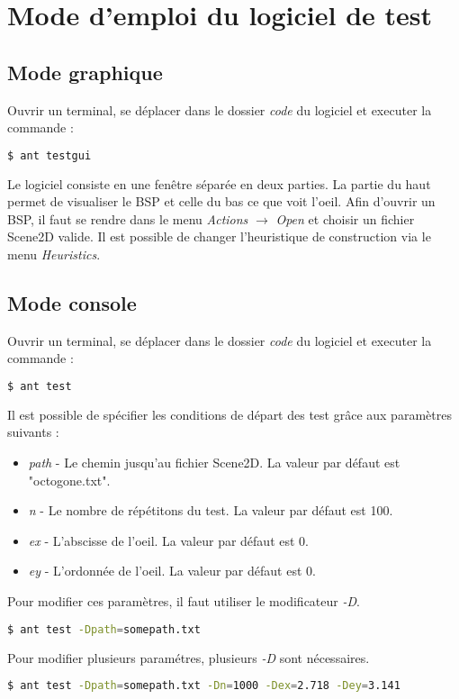 \documentclass[11pts]{article}
\begin{document}
\newpage
\section{Mode d'emploi du logiciel de test}
\subsection*{Mode graphique}
Ouvrir un terminal, se déplacer dans le dossier \emph{code} du logiciel et executer la commande :
\begin{lstlisting}[language=bash]
$ ant testgui
\end{lstlisting}
Le logiciel consiste en une fenêtre séparée en deux parties. La partie du haut permet de visualiser le BSP et celle du bas ce que voit l'oeil.
Afin d'ouvrir un BSP, il faut se rendre dans le menu \emph{Actions} $\rightarrow$ \emph{Open} et choisir un fichier Scene2D valide.
Il est possible de changer l'heuristique de construction via le menu \emph{Heuristics}.
\subsection*{Mode console}
Ouvrir un terminal, se déplacer dans le dossier \emph{code} du logiciel et executer la commande :
\begin{lstlisting}[language=bash]
$ ant test
\end{lstlisting}
Il est possible de spécifier les conditions de départ des test grâce aux paramètres suivants :
\begin{itemize}
\item \emph{path} - Le chemin jusqu'au fichier Scene2D. La valeur par défaut est "octogone.txt".
\item \emph{n} - Le nombre de répétitons du test. La valeur par défaut est 100.
\item \emph{ex} - L'abscisse de l'oeil. La valeur par défaut est 0.
\item \emph{ey} - L'ordonnée de l'oeil. La valeur par défaut est 0.
\end{itemize}
Pour modifier ces paramètres, il faut utiliser le modificateur \emph{-D}.
\begin{lstlisting}[language=bash]
$ ant test -Dpath=somepath.txt
\end{lstlisting}
Pour modifier plusieurs paramétres, plusieurs \emph{-D} sont nécessaires.
\begin{lstlisting}[language=bash]
$ ant test -Dpath=somepath.txt -Dn=1000 -Dex=2.718 -Dey=3.141
\end{lstlisting}
\end{document}
